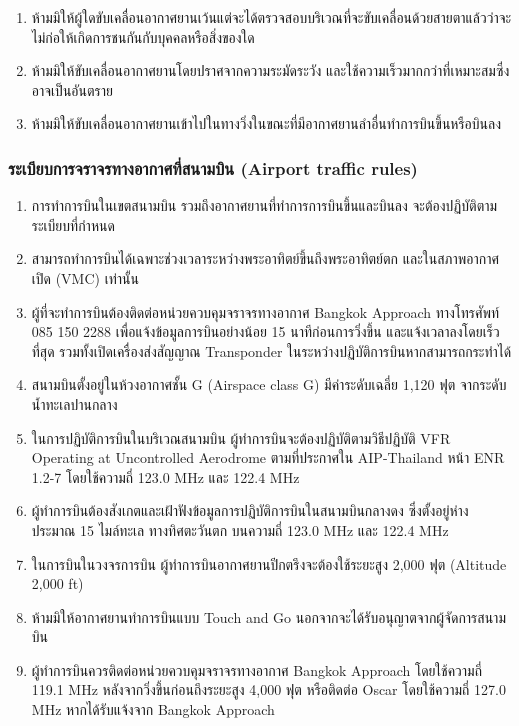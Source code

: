 \begin{enumerate}
\item ห้ามมิให้ผู้ใดขับเคลื่อนอากาศยานเว้นแต่จะได้ตรวจสอบบริเวณที่จะขับเคลื่อนด้วยสายตาแล้วว่าจะไม่ก่อให้เกิดการชนกันกับบุคคลหรือสิ่งของใด
\item ห้ามมิให้ขับเคลื่อนอากาศยานโดยปราศจากความระมัดระวัง และใช้ความเร็วมากกว่าที่เหมาะสมซึ่งอาจเป็นอันตราย
\item ห้ามมิให้ขับเคลื่อนอากาศยานเข้าไปในทางวิ่งในขณะที่มีอากาศยานลำอื่นทำการบินขึ้นหรือบินลง
\end{enumerate}

\subsubsection{ระเบียบการจราจรทางอากาศที่สนามบิน (Airport traffic rules)}

\begin{enumerate}
\item การทำการบินในเขตสนามบิน รวมถึงอากาศยานที่ทำการการบินขึ้นและบินลง จะต้องปฏิบัติตามระเบียบที่กำหนด
\item สามารถทำการบินได้เฉพาะช่วงเวลาระหว่างพระอาทิตย์ขึ้นถึงพระอาทิตย์ตก และในสภาพอากาศเปิด (VMC) เท่านั้น
\item ผู้ที่จะทำการบินต้องติดต่อหน่วยควบคุมจราจรทางอากาศ Bangkok Approach ทางโทรศัพท์ 085 150 2288 เพื่อแจ้งข้อมูลการบินอย่างน้อย 15 นาทีก่อนการวิ่งขึ้น และแจ้งเวลาลงโดยเร็วที่สุด รวมทั้งเปิดเครื่องส่งสัญญาณ Transponder ในระหว่างปฏิบัติการบินหากสามารถกระทำได้
\item สนามบินตั้งอยู่ในห้วงอากาศชั้น G (Airspace class G) มีค่าระดับเฉลี่ย 1,120 ฟุต จากระดับน้ำทะเลปานกลาง 
\item ในการปฏิบัติการบินในบริเวณสนามบิน ผู้ทำการบินจะต้องปฏิบัติตามวิธีปฏิบัติ VFR Operating at Uncontrolled Aerodrome ตามที่ประกาศใน AIP-Thailand หน้า ENR 1.2-7 โดยใช้ความถี่ 123.0 MHz และ 122.4 MHz
\item ผู้ทำการบินต้องสังเกตและเฝ้าฟังข้อมูลการปฏิบัติการบินในสนามบินกลางดง ซึ่งตั้งอยู่ห่างประมาณ 15 ไมล์ทะเล ทางทิศตะวันตก บนความถี่ 123.0 MHz และ 122.4 MHz
\item ในการบินในวงจรการบิน ผู้ทำการบินอากาศยานปีกตรึงจะต้องใช้ระยะสูง 2,000 ฟุต (Altitude 2,000 ft) 
\item ห้ามมิให้อากาศยานทำการบินแบบ Touch and Go นอกจากจะได้รับอนุญาตจากผู้จัดการสนามบิน
\item ผู้ทำการบินควรติดต่อหน่วยควบคุมจราจรทางอากาศ Bangkok Approach โดยใช้ความถี่ 119.1 MHz หลังจากวิ่งขึ้นก่อนถึงระยะสูง 4,000 ฟุต หรือติดต่อ Oscar โดยใช้ความถี่ 127.0 MHz หากได้รับแจ้งจาก Bangkok Approach
\end{enumerate}

